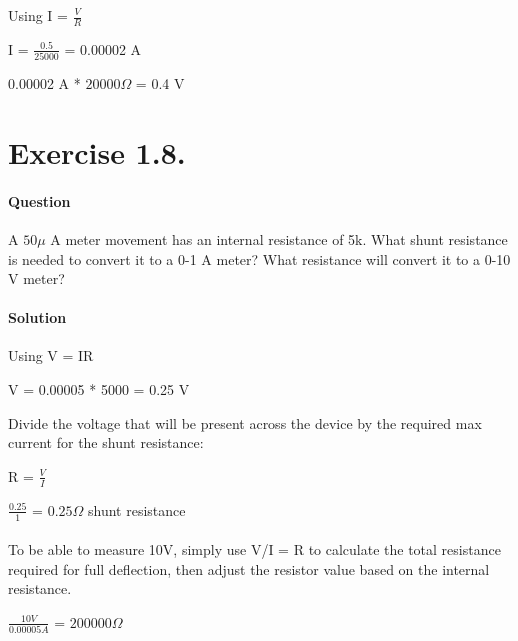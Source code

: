 \documentclass[a4paper, 12pt]{article}
\begin{document}
Using I = $\frac{V}{R}$\newline


I = $\frac{0.5}{25000}$ = 0.00002 A\newline

0.00002 A * $20000\Omega$ = 0.4 V\newline

\clearpage

\section{Exercise 1.8.}

\paragraph{Question\newline}

A $50\mu$ A meter movement has an internal resistance of 5k. What shunt resistance is needed to convert it to a 0-1 A meter? What resistance will convert it to a 0-10 V meter?

\paragraph{Solution\newline}

Using V = IR\newline

V = 0.00005 * 5000 = 0.25 V\newline

Divide the voltage that will be present across the device by the required max current for the shunt resistance:\newline

R = $\frac{V}{I}$\newline

$\frac{0.25}{1}$ = $0.25\Omega$ shunt resistance\newline

\paragraph{\newline}

To be able to measure 10V, simply use V/I = R to calculate the total resistance required for full deflection, then adjust the resistor value based on the internal resistance.\newline

$\frac{10 V}{0.00005 A}$ = $200000\Omega$\newline
\end{document}
